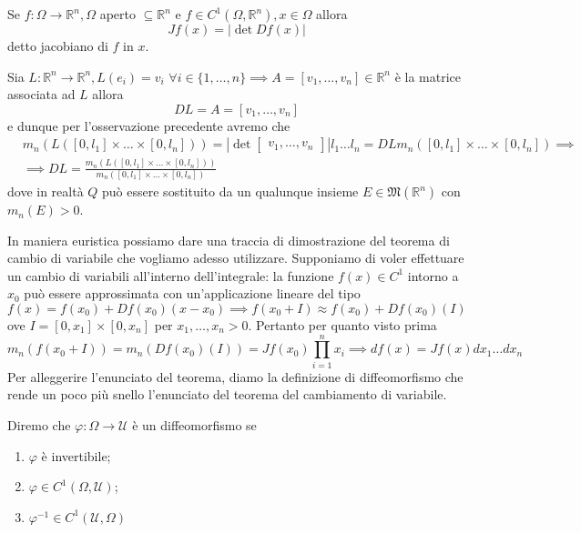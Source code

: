 \begin{definition}[jacobiano]
	Se $f: \Omega \to \mathbb{R}^n, \Omega$ aperto $\subseteq \mathbb{R}^n$ e $f \in C^1(\Omega, \mathbb{R}^n), x \in \Omega$ allora
	$$
	Jf(x) = |\det{Df(x)}|
	$$
	detto jacobiano di $f$ in $x$.
\end{definition}
\begin{remark}
	Sia $L: \mathbb{R}^n \to \mathbb{R}^n, L(e_i) = v_i \, \, \forall i \in \{1, \ldots, n \} \implies A = [v_1, \ldots, v_n] \in \mathbb{R}^n$ è la matrice associata ad $L$ allora
	$$
	DL = A = [v_1, \ldots, v_n]
	$$
	e dunque per l'osservazione precedente avremo che
	\begin{align*}
	&m_n (L([0, l_1] \times \ldots \times [0, l_n])) = \left| \det \begin{bmatrix} v_1, \ldots, v_n \end{bmatrix} \right| l_1 \ldots l_n = DL m_n([0, l_1] \times \ldots \times [0, l_n]) \implies \\ 
	&\implies DL = \frac{m_n(L([0, l_1] \times \ldots \times [0, l_n]))}{m_n([0, l_1] \times \ldots \times [0, l_n])}
	\end{align*}
	dove in realtà $Q$ può essere sostituito da un qualunque insieme $E \in \mathfrak{M}(\mathbb{R}^n)$ con $m_n(E) > 0$.
\end{remark}
In maniera euristica possiamo dare una traccia di dimostrazione del teorema di cambio di variabile che vogliamo adesso utilizzare. Supponiamo di voler effettuare un cambio di variabili all'interno dell'integrale: la funzione $f(x) \in C^1$ intorno a $x_0$ può
essere approssimata con un'applicazione lineare del tipo
$$
f(x) = f(x_0) + Df(x_0)(x-x_0) \implies f(x_0 + I) \approx f(x_0) + Df(x_0)(I)
$$
ove $I=[0, x_1] \times [0, x_n]$ per $x_1, \ldots, x_n > 0$. Pertanto per quanto visto prima
$$
m_n(f(x_0 + I)) = m_n(Df(x_0)(I)) = Jf(x_0) \prod_{i=1}^n x_i \implies df(x) = Jf(x) dx_1 \ldots dx_n
$$
Per alleggerire l'enunciato del teorema, diamo la definizione di diffeomorfismo che rende un poco più snello l'enunciato del teorema del cambiamento di variabile.
\begin{definition}[diffeomorfismo]
	Diremo che $\varphi: \Omega \to \mathcal{U}$ è un diffeomorfismo se 
	\begin{enumerate}[label=\protect\circled{\arabic*}]
		\item $\varphi$ è invertibile; 
		\item $\varphi \in C^1(\Omega, \mathcal{U})$;
		\item $\varphi^{-1} \in C^1(\mathcal{U}, \Omega)$
	\end{enumerate}
\end{definition}
